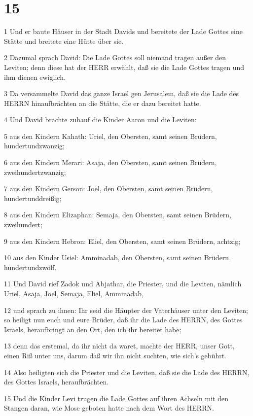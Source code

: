 \chapter{15}

\par 1 Und er baute Häuser in der Stadt Davids und bereitete der Lade Gottes eine Stätte und breitete eine Hütte über sie.
\par 2 Dazumal sprach David: Die Lade Gottes soll niemand tragen außer den Leviten; denn diese hat der HERR erwählt, daß sie die Lade Gottes tragen und ihm dienen ewiglich.
\par 3 Da versammelte David das ganze Israel gen Jerusalem, daß sie die Lade des HERRN hinaufbrächten an die Stätte, die er dazu bereitet hatte.
\par 4 Und David brachte zuhauf die Kinder Aaron und die Leviten:
\par 5 aus den Kindern Kahath: Uriel, den Obersten, samt seinen Brüdern, hundertundzwanzig;
\par 6 aus den Kindern Merari: Asaja, den Obersten, samt seinen Brüdern, zweihundertzwanzig;
\par 7 aus den Kindern Gerson: Joel, den Obersten, samt seinen Brüdern, hundertunddreißig;
\par 8 aus den Kindern Elizaphan: Semaja, den Obersten, samt seinen Brüdern, zweihundert;
\par 9 aus den Kindern Hebron: Eliel, den Obersten, samt seinen Brüdern, achtzig;
\par 10 aus den Kinder Usiel: Amminadab, den Obersten, samt seinen Brüdern, hundertundzwölf.
\par 11 Und David rief Zadok und Abjathar, die Priester, und die Leviten, nämlich Uriel, Asaja, Joel, Semaja, Eliel, Amminadab,
\par 12 und sprach zu ihnen: Ihr seid die Häupter der Vaterhäuser unter den Leviten; so heiligt nun euch und eure Brüder, daß ihr die Lade des HERRN, des Gottes Israels, heraufbringt an den Ort, den ich ihr bereitet habe;
\par 13 denn das erstemal, da ihr nicht da waret, machte der HERR, unser Gott, einen Riß unter uns, darum daß wir ihn nicht suchten, wie sich's gebührt.
\par 14 Also heiligten sich die Priester und die Leviten, daß sie die Lade des HERRN, des Gottes Israels, heraufbrächten.
\par 15 Und die Kinder Levi trugen die Lade Gottes auf ihren Achseln mit den Stangen daran, wie Mose geboten hatte nach dem Wort des HERRN.
